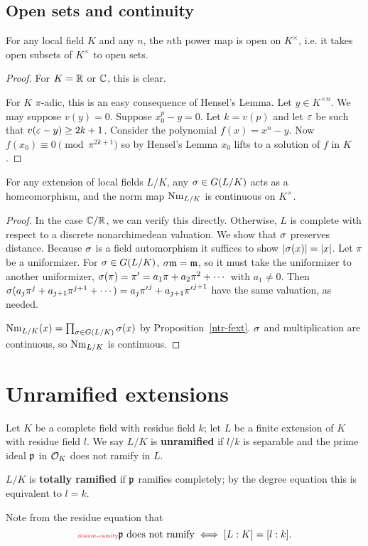\subsection{Open sets and continuity}
\begin{pr}
For any local field $K$ and any $n$, the $n$th power map is open on $K^{\times}$, i.e. it takes open subsets of $K^{\times}$ to open sets.
\end{pr}
\begin{proof}
For $K=\mathbb{R}$ or $\mathbb{C}$, this is clear.

For $K$ $\pi$-adic, this is an easy consequence of Hensel's Lemma. Let $y\in K^{\times n}$. We may suppose $v(y)=0$. Suppose $x_0^p-y=0$. Let $k=v(p)$ and
let $\varepsilon$ be such that $v(\varepsilon-y)\ge 2k+1$. Consider the polynomial $f(x)=x^n-y$. Now $f(x_0)\equiv 0\pmod{\pi^{2k+1}}$ so by Hensel's Lemma $x_0$ lifts to a solution of $f$ in $K$. 
\end{proof}
\begin{pr}
For any extension of local fields $L/K$, any $\sigma\in G(L/K)$ acts as a homeomorphism, and the norm map $\operatorname{Nm}_{L/K}$ is continuous on $K^{\times}$.
\end{pr}
\begin{proof}
In the case $\mathbb{C}/\mathbb{R}$, we can verify this directly. Otherwise, $L$ is complete with respect to a discrete nonarchimedean valuation. We show that $\sigma$ preserves distance. Because $\sigma$ is a field automorphism it suffices to show $|\sigma(x)|=|x|$. 
Let $\pi$ be a uniformizer. For $\sigma\in G(L/K)$, $\sigma \mathfrak{m}=\mathfrak{m}$, so it must take the uniformizer to another uniformizer, $\sigma(\pi)=\pi'=a_1\pi+a_2\pi^2+\cdots $ with $a_1\ne 0$. Then $\sigma(a_j\pi^j+a_{j+1}\pi^{j+1}+\cdots)=a_j{\pi'}^j+a_{j+1}{\pi'}^{j+1}$ have the same valuation, as needed. 

$\operatorname{Nm}_{L/K}(x) = \prod_{\sigma\in G(L/K)}\sigma(x)$ by Proposition~\ref{ntr-fext}. $\sigma$ and multiplication are continuous, so $\operatorname{Nm}_{L/K}$ is continuous.
\end{proof}
\section{Unramified extensions}
\begin{df}
Let $K$ be a complete field with residue field $k$; let $L$ be a finite extension of $K$ with residue field $l$. We say $L/K$ is \textbf{unramified} if $l/k$ is separable and the prime ideal $\mathfrak{p}$ in $\mathcal{O}_K$ does not ramify in $L$.

$L/K$ is \textbf{totally ramified} if $\mathfrak{p}$ ramifies completely; by the degree equation this is equivalent to $l=k$.
\end{df}
Note from the residue equation that 
\begin{equation}\llabel{doesnt-ramify}
\mfp\text{ does not ramify} \iff [L:K]=[l:k].
\end{equation}

